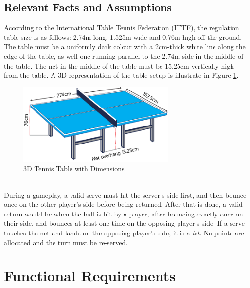 \documentclass[11pt]{article}
\begin{document}
\subsection{Relevant Facts and Assumptions}
According to the International Table Tennis Federation (ITTF), the regulation table size is as follows: 2.74m long, 1.525m wide and 0.76m high off the ground. The table must be a uniformly dark colour with a 2cm-thick white line along the edge of the table, as well one running parallel to the 2.74m side in the middle of the table. The net in the middle of the table must be 15.25cm vertically high from the table. A 3D representation of the table setup is illustrate in Figure \ref{fig:table-tennis-dim}.
\begin{figure}[htbp]
   \centering
   \includegraphics[width=0.7\textwidth]{img/table-tennis-dim.png} %
   \caption{3D Tennis Table with Dimensions}
   \label{fig:table-tennis-dim}
\end{figure} \\
During a gameplay, a valid serve must hit the server's side first, and then bounce once on the other player's side before being returned. After that is done, a valid return would be when the ball is hit by a player, after bouncing exactly once on their side, and bounces at least one time on the opposing player's side. If a serve touches the net and lands on the opposing player's side, it is a \textit{let}. No points are allocated and the turn must be re-served.
\section{Functional Requirements}
\end{document}
